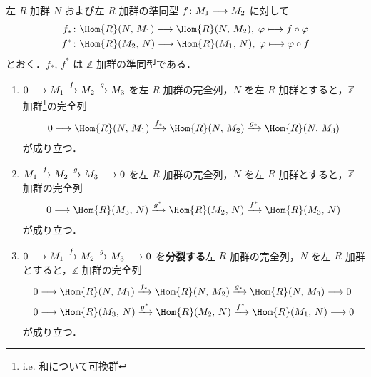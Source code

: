\documentclass[algtopo_main]{subfiles}
\begin{document}
左 $R$ 加群 $N$ および左 $R$ 加群の準同型 $f \colon M_1 \longrightarrow M_2$ に対して
\begin{align}
    f_* &\colon \Hom{R}(N,\, M_1) \lto \Hom{R}(N,\, M_2),\; \varphi \lmto f \circ \varphi \\
    f^* &\colon \Hom{R}(M_2,\, N) \lto \Hom{R}(M_1,\, N),\; \varphi \lmto \varphi \circ f
\end{align}
とおく．$f_*,\, f^*$ は $\mathbb{Z}$ 加群の準同型である．

\begin{myprop}[label=prop:Hom-split]{}
    \begin{enumerate}
        \item $0 \longrightarrow M_1 \xrightarrow{f} M_2 \xrightarrow{g} M_3$ を左 $R$ 加群の完全列，$N$ を左 $R$ 加群とすると，$\mathbb{Z}$ 加群\footnote{i.e. 和について可換群}の完全列
        \begin{align}
            0 \lto \Hom{R}(N,\, M_1) \xrightarrow{f_*} \Hom{R}(N,\, M_2) \xrightarrow{g_*} \Hom{R}(N,\, M_3)
        \end{align}
        が成り立つ．
        \item $M_1 \xrightarrow{f} M_2 \xrightarrow{g} M_3 \longrightarrow 0$ を左 $R$ 加群の完全列，$N$ を左 $R$ 加群とすると，$\mathbb{Z}$ 加群の完全列
        \begin{align}
            0 \lto \Hom{R}(M_3,\, N) \xrightarrow{g^*} \Hom{R}(M_2,\, N) \xrightarrow{f^*} \Hom{R}(M_3,\, N)
        \end{align}
        が成り立つ．
        \item $0 \longrightarrow M_1 \xrightarrow{f} M_2 \xrightarrow{g} M_3 \longrightarrow 0$ を\textbf{分裂する}左 $R$ 加群の完全列，$N$ を左 $R$ 加群とすると，$\mathbb{Z}$ 加群の完全列
        \begin{align}
            &0 \lto \Hom{R}(N,\, M_1) \xrightarrow{f_*} \Hom{R}(N,\, M_2) \xrightarrow{g_*} \Hom{R}(N,\, M_3) \lto 0\\
            &0 \lto \Hom{R}(M_3,\, N) \xrightarrow{g^*} \Hom{R}(M_2,\, N) \xrightarrow{f^*} \Hom{R}(M_1,\, N) \lto 0
        \end{align}
        が成り立つ．
    \end{enumerate}
\end{myprop}
\end{document}
